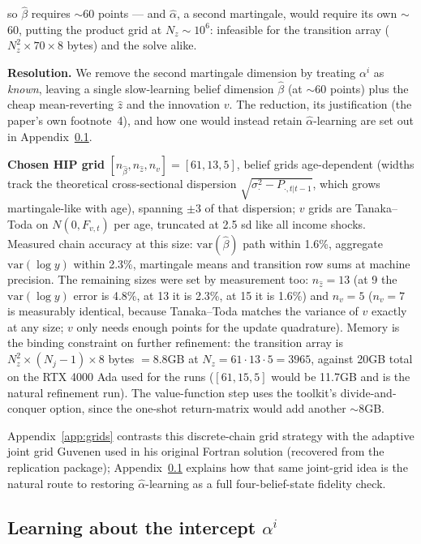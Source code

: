 \documentclass[11pt,fleqn]{article}
\begin{document}
\noindent so $\hat\beta$ requires $\sim$60 points --- and $\hat\alpha$, a second
martingale, would require its own $\sim$60, putting the product grid at
$N_z\sim10^6$: infeasible for the transition array
($N_z^2 \times 70\times 8$ bytes) and the solve alike.

\textbf{Resolution.} We remove the second martingale dimension by treating $\alpha^i$ as
\emph{known}, leaving a single slow-learning belief dimension $\hat\beta$ (at $\sim$60
points) plus the cheap mean-reverting $\hat z$ and the innovation $v$. The reduction, its
justification (the paper's own footnote~4), and how one would instead retain
$\hat\alpha$-learning are set out in Appendix~\ref{app:alpha}.

\textbf{Chosen HIP grid} $[n_{\hat\beta},n_{\hat z},n_v]=[61,13,5]$, belief grids
age-dependent (widths track the theoretical cross-sectional dispersion
$\sqrt{\sigma^2_{\cdot}-P_{\cdot,t|t-1}}$, which grows martingale-like with age),
spanning $\pm3$ of that dispersion; $v$ grids are Tanaka--Toda on $N(0,F_{v,t})$
per age, truncated at 2.5 sd like all income shocks. Measured chain accuracy at this
size: $\mathrm{var}(\hat\beta)$ path within 1.6\%, aggregate $\mathrm{var}(\log y)$
within 2.3\%, martingale means and transition row sums at machine precision.
The remaining sizes were set by measurement too: $n_{\hat z}=13$ (at 9 the
$\mathrm{var}(\log y)$ error is 4.8\%, at 13 it is 2.3\%, at 15 it is 1.6\%) and
$n_v=5$ ($n_v=7$ is measurably identical, because Tanaka--Toda matches the variance
of $v$ exactly at any size; $v$ only needs enough points for the update quadrature).
Memory is the binding constraint on further refinement: the transition array is
$N_z^2\times(N_j-1)\times 8$ bytes $=8.8$GB at $N_z=61\cdot13\cdot5=3965$, against
20GB total on the RTX 4000 Ada used for the runs ($[61,15,5]$ would be 11.7GB and is
the natural refinement run). The value-function step uses the toolkit's
divide-and-conquer option, since the one-shot return-matrix would add another
$\sim$8GB.

Appendix~\ref{app:grids} contrasts this discrete-chain grid strategy with the adaptive
joint grid Guvenen used in his original Fortran solution (recovered from the replication
package); Appendix~\ref{app:alpha} explains how that same joint-grid idea is the natural
route to restoring $\hat\alpha$-learning as a full four-belief-state fidelity check.


\subsection{Learning about the intercept $\alpha^i$}
\label{app:alpha}
\end{document}
